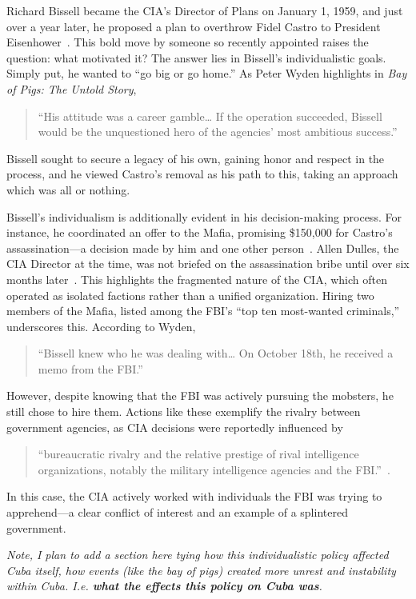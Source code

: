 \documentclass{article}
\begin{document}
    Richard Bissell became the CIA's Director of Plans on January 1, 1959, and just over a year later, he proposed a plan to overthrow Fidel Castro to President Eisenhower~\parencite{Wyden1979}. This bold move by someone so recently appointed raises the question: what motivated it? The answer lies in Bissell's individualistic goals. Simply put, he wanted to “go big or go home.” As Peter Wyden highlights in \textit{Bay of Pigs: The Untold Story}, 
    \begin{quotation}
        “His attitude was a career gamble… If the operation succeeded, Bissell would be the unquestioned hero of the agencies' most ambitious success.”
    \end{quotation} 
    Bissell sought to secure a legacy of his own, gaining honor and respect in the process, and he viewed Castro's removal as his path to this, taking an approach which was all or nothing.

    Bissell's individualism is additionally evident in his decision-making process. For instance, he coordinated an offer to the Mafia, promising \$150,000 for Castro's assassination—a decision made by him and one other person~\parencite{Wyden1979}. Allen Dulles, the CIA Director at the time, was not briefed on the assassination bribe until over six months later~\parencite{Wyden1979}. This highlights the fragmented nature of the CIA, which often operated as isolated factions rather than a unified organization. Hiring two members of the Mafia, listed among the FBI's “top ten most-wanted criminals,” underscores this. According to Wyden, \begin{quotation}
        “Bissell knew who he was dealing with… On October 18th, he received a memo from the FBI.”~\parencite{Wyden1979}
    \end{quotation}  
    However, despite knowing that the FBI was actively pursuing the mobsters, he still chose to hire them. Actions like these exemplify the rivalry between government agencies, as CIA decisions were reportedly influenced by 
    \begin{quotation} 
        “bureaucratic rivalry and the relative prestige of rival intelligence organizations, notably the military intelligence agencies and the FBI.”~\parencite{JeffreysJones2003}.
    \end{quotation} 
    In this case, the CIA actively worked with individuals the FBI was trying to apprehend—a clear conflict of interest and an example of a splintered government.

    \textit{Note, I plan to add a section here tying how this individualistic policy affected Cuba itself, how events (like the bay of pigs) created more unrest and instability within Cuba. I.e. \textbf{what the effects this policy on Cuba was}.}
\end{document}
